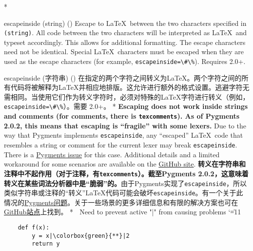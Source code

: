 \begin{optionlist}
\begin{paracol}{2}
\switchcolumn[0]*%
\item[escapeinside (string) (\meta{none})]
Escape to \LaTeX\ between the two characters specified in \texttt{\string(string\string)}.  All code between the two characters will be interpreted as \LaTeX\ and typeset accordingly.  This allows for additional formatting.  The escape characters need not be identical.  Special \LaTeX\ characters must be escaped when they are used as the escape characters (for example, \texttt{escapeinside=\textbackslash\#\textbackslash\%}).  Requires  2.0+.
\switchcolumn
\item[escapeinside (字符串) (\meta{无})]
在指定的两个字符之间转义为\LaTeX{}。两个字符之间的所有代码将被解释为\LaTeX{}并相应地排版。这允许进行额外的格式设置。逃避字符无需相同。当使用它们作为转义字符时，必须对特殊的\LaTeX{}字符进行转义（例如，\texttt{escapeinside=\textbackslash\#\textbackslash\%}）。需要 2.0+。
\switchcolumn[0]*%
\textbf{Escaping does not work inside strings and comments (for comments, there is \texttt{texcomments}).  As of Pygments 2.0.2, this means that escaping is ``fragile'' with some lexers.}  Due to the way that Pygments implements \texttt{escapeinside}, any ``escaped'' \LaTeX\ code that resembles a string or comment for the current lexer may break \texttt{escapeinside}.  There is a \href{https://bitbucket.org/birkenfeld/pygments-main/issue/1118}{Pygments issue} for this case.  Additional details and a limited workaround for some scenarios are available on the \href{https://github.com/gpoore/minted/issues/70#issuecomment-111729930}{ GitHub site}.
\switchcolumn
\textbf{转义在字符串和注释中不起作用（对于注释，有\texttt{texcomments}）。截至Pygments 2.0.2，这意味着转义在某些词法分析器中是“脆弱”的。}由于Pygments实现了\texttt{escapeinside}，所以类似字符串或注释的“转义”\LaTeX{}代码可能会破坏\texttt{escapeinside}。有一个关于此情况的\href{https://bitbucket.org/birkenfeld/pygments-main/issue/1118}{Pygments问题}。关于一些场景的更多详细信息和有限的解决方案也可在\href{https://github.com/gpoore/minted/issues/70#issuecomment-111729930}{ GitHub站点}上找到。
\switchcolumn[0]*%
\begingroup  ^^A Need to prevent active "|" from causing problems
\catcode`\|=11
\begin{example}
    \begin{verbatim}
    def f(x):
        y = x|\colorbox{green}{**}|2
        return y

\end{verbatim}
\end{example}
\end{paracol}
\end{optionlist}
